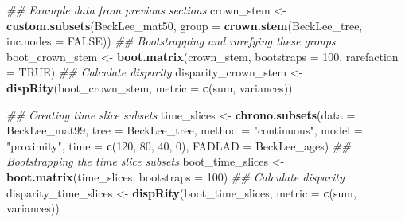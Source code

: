 \documentclass[]{book}
\newenvironment{Shaded}{\begin{snugshade}}{\end{snugshade}}
\newcommand{\CommentTok}[1]{\textcolor[rgb]{0.56,0.35,0.01}{\textit{#1}}}
\newcommand{\DataTypeTok}[1]{\textcolor[rgb]{0.13,0.29,0.53}{#1}}
\newcommand{\DecValTok}[1]{\textcolor[rgb]{0.00,0.00,0.81}{#1}}
\newcommand{\KeywordTok}[1]{\textcolor[rgb]{0.13,0.29,0.53}{\textbf{#1}}}
\newcommand{\NormalTok}[1]{#1}
\newcommand{\OtherTok}[1]{\textcolor[rgb]{0.56,0.35,0.01}{#1}}
\newcommand{\StringTok}[1]{\textcolor[rgb]{0.31,0.60,0.02}{#1}}
\begin{document}
\begin{Shaded}
\begin{Highlighting}[]
\CommentTok{## Example data from previous sections}
\NormalTok{crown_stem <-}\StringTok{ }\KeywordTok{custom.subsets}\NormalTok{(BeckLee_mat50,}
                             \DataTypeTok{group =} \KeywordTok{crown.stem}\NormalTok{(BeckLee_tree,}
                             \DataTypeTok{inc.nodes =} \OtherTok{FALSE}\NormalTok{))}
\CommentTok{## Bootstrapping and rarefying these groups}
\NormalTok{boot_crown_stem <-}\StringTok{ }\KeywordTok{boot.matrix}\NormalTok{(crown_stem, }\DataTypeTok{bootstraps =} \DecValTok{100}\NormalTok{,}
                               \DataTypeTok{rarefaction =} \OtherTok{TRUE}\NormalTok{)}
\CommentTok{## Calculate disparity}
\NormalTok{disparity_crown_stem <-}\StringTok{ }\KeywordTok{dispRity}\NormalTok{(boot_crown_stem,}
                                 \DataTypeTok{metric =} \KeywordTok{c}\NormalTok{(sum, variances))}

\CommentTok{## Creating time slice subsets}
\NormalTok{time_slices <-}\StringTok{ }\KeywordTok{chrono.subsets}\NormalTok{(}\DataTypeTok{data =}\NormalTok{ BeckLee_mat99,}
                              \DataTypeTok{tree =}\NormalTok{ BeckLee_tree,}
                              \DataTypeTok{method =} \StringTok{"continuous"}\NormalTok{,}
                              \DataTypeTok{model =} \StringTok{"proximity"}\NormalTok{,}
                              \DataTypeTok{time =} \KeywordTok{c}\NormalTok{(}\DecValTok{120}\NormalTok{, }\DecValTok{80}\NormalTok{, }\DecValTok{40}\NormalTok{, }\DecValTok{0}\NormalTok{),}
                              \DataTypeTok{FADLAD =}\NormalTok{ BeckLee_ages)}
\CommentTok{## Bootstrapping the time slice subsets}
\NormalTok{boot_time_slices <-}\StringTok{ }\KeywordTok{boot.matrix}\NormalTok{(time_slices, }\DataTypeTok{bootstraps =} \DecValTok{100}\NormalTok{)}
\CommentTok{## Calculate disparity}
\NormalTok{disparity_time_slices <-}\StringTok{ }\KeywordTok{dispRity}\NormalTok{(boot_time_slices,}
                                  \DataTypeTok{metric =} \KeywordTok{c}\NormalTok{(sum, variances))}


\end{Highlighting}
\end{Shaded}
\end{document}
